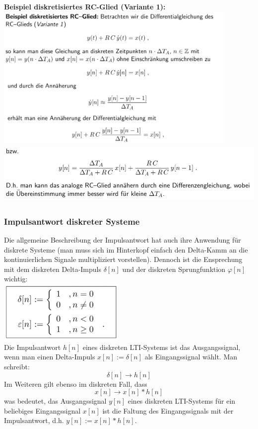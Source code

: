 \documentclass[12pt,a4paper]{scrartcl}
\begin{document}
  \noindent \textbf{Beispiel diskretisiertes RC-Glied (Variante 1):} \\
  \includegraphics[height=7cm]{Pictures/BSPdis.png} \\
  \includegraphics[height=3cm]{Pictures/BSPdis2.png} \\

  \subsubsection{Impulsantwort diskreter Systeme}
  \label{sec:sub:sub:impulsantwort-diskreter-systeme}

  Die allgemeine Beschreibung der Impulsantwort hat auch ihre Anwendung für diskrete Systeme (man muss sich im Hinterkopf einfach den Delta-Kamm an die kontinuierlichen Signale multipliziert vorstellen). 
  Dennoch ist die Ensprechung mit dem diskreten Delta-Impuls $\delta[n]$ und der diskreten Sprungfunktion $\varphi[n]$ wichtig:\\
  \includegraphics[height=3cm]{Pictures/functions.png}  \\
  Die Impulsantwort $h[n]$ eines diskreten LTI-Systems ist das Ausgangssignal, wenn man einen Delta-Impuls $x[n]:= \delta[n]$ als Eingangssignal wählt. Man schreibt:
  $$ \delta[n] \to h[n]$$
  \noindent Im Weiteren gilt ebenso im diskreten Fall, dass 
  \begin{equation}
    \label{eq:40}
    x[n] \to x[n] * h[n]
  \end{equation}
  was bedeutet, das Ausgangssignal $y[n]$ eines diskreten LTI-Systems für ein beliebiges Eingangssignal $x[n]$ ist die Faltung des Eingangssignals mit der Impulsantwort, d.h. $y[n] := x[n] * h[n]$. \\
\end{document}
